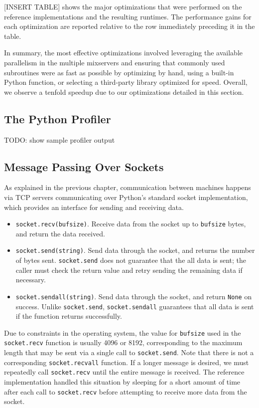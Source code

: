 [INSERT TABLE] shows the major optimizations that were performed on the reference implementations and the resulting runtimes. The performance gains for each optimization are reported relative to the row immediately preceding it in the table.

In summary, the most effective optimizations involved leveraging the available parallelism in the multiple mixservers and ensuring that commonly used subroutines were as fast as possible by optimizing by hand, using a built-in Python function, or selecting a third-party library optimized for speed. Overall, we observe a tenfold speedup due to our optimizations detailed in this section.

\subsection{The Python Profiler}

TODO: show sample profiler output

\subsection{Message Passing Over Sockets}

As explained in the previous chapter, communication between machines happens via TCP servers communicating over Python's standard socket implementation, which provides an interface for sending and receiving data.
\begin{itemize}
\item \texttt{socket.recv(bufsize)}. Receive data from the socket up to \texttt{bufsize} bytes, and return the data received.
\item \texttt{socket.send(string)}. Send data through the socket, and returns the number of bytes sent. \texttt{socket.send} does not guarantee that the all data is sent; the caller must check the return value and retry sending the remaining data if necessary.
\item \texttt{socket.sendall(string)}. Send data through the socket, and return \texttt{None} on success. Unlike \texttt{socket.send}, \texttt{socket.sendall} guarantees that all data is sent if the function returns successfully.
\end{itemize}

Due to constraints in the operating system, the value for \texttt{bufsize} used in the \texttt{socket.recv} function is usually 4096 or 8192, corresponding to the maximum length that may be sent via a single call to \texttt{socket.send}. Note that there is not a corresponding \texttt{socket.recvall} function. If a longer message is desired, we must repeatedly call \texttt{socket.recv} until the entire message is received. The reference implementation handled this situation by sleeping for a short amount of time after each call to \texttt{socket.recv} before attempting to receive more data from the socket.

